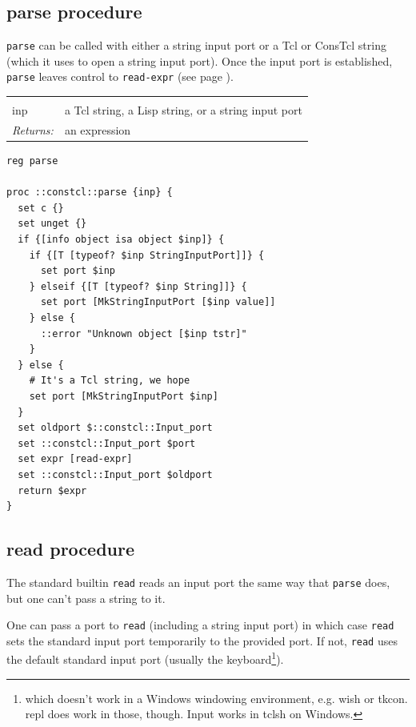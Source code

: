 \documentclass[twoside]{report}
\begin{document}
\subsection{parse procedure}
\label{parse-procedure}

\texttt{parse} can be called with either a string input port or a Tcl or ConsTcl string (which it uses to open a string input port). Once the input port is established, \texttt{parse} leaves control to \texttt{read-expr} (see page \pageref{readexpr-procedure}).

\noindent\begin{tabular}{ |p{1.9cm} p{8cm}| }
\hline
\rowcolor[HTML]{CCCCCC} \multicolumn{2}{|l|}{\bf parse (internal)} \\
inp & a Tcl string, a Lisp string, or a string input port \\
\textit{Returns:} & an expression \\
\hline
\end{tabular}

\begin{lstlisting}
reg parse

proc ::constcl::parse {inp} {
  set c {}
  set unget {}
  if {[info object isa object $inp]} {
    if {[T [typeof? $inp StringInputPort]]} {
      set port $inp
    } elseif {[T [typeof? $inp String]]} {
      set port [MkStringInputPort [$inp value]]
    } else {
      ::error "Unknown object [$inp tstr]"
    }
  } else {
    # It's a Tcl string, we hope
    set port [MkStringInputPort $inp]
  }
  set oldport $::constcl::Input_port
  set ::constcl::Input_port $port
  set expr [read-expr]
  set ::constcl::Input_port $oldport
  return $expr
}
\end{lstlisting}

\subsection{read procedure}
\label{read-procedure}

The standard builtin \texttt{read} reads an input port the same way that \texttt{parse} does, but one can't pass a string to it.

One can pass a port to \texttt{read} (including a string input port) in which case \texttt{read} sets the standard input port temporarily to the provided port. If not, \texttt{read} uses the default standard input port (usually the keyboard\footnote{which doesn't work in a Windows windowing environment, e.g. wish or tkcon. repl does work in those, though. Input works in tclsh on Windows.}).
\end{document}
